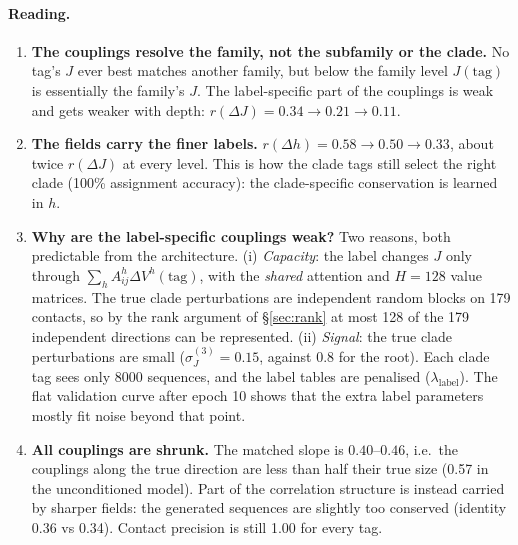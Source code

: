 \paragraph{Reading.}
\begin{enumerate}
\item \textbf{The couplings resolve the family, not the subfamily or the clade.} No tag's $J$ ever best
matches another family, but below the family level $J(\text{tag})$ is essentially the family's $J$. The
label-specific part of the couplings is weak and gets weaker with depth: $r(\Delta J)=0.34\to0.21\to0.11$.
\item \textbf{The fields carry the finer labels.} $r(\Delta h)=0.58\to0.50\to0.33$, about twice
$r(\Delta J)$ at every level. This is how the clade tags still select the right clade (100\% assignment
accuracy): the clade-specific conservation is learned in $h$.
\item \textbf{Why are the label-specific couplings weak?} Two reasons, both predictable from the architecture.
  (i) \emph{Capacity}: the label changes $J$ only through $\sum_hA^h_{ij}\Delta V^h(\text{tag})$, with the
  \emph{shared} attention and $H=128$ value matrices. The true clade perturbations are independent random blocks
  on 179 contacts, so by the rank argument of \S\ref{sec:rank} at most 128 of the 179 independent directions
  can be represented. (ii) \emph{Signal}: the true clade perturbations are small ($\sigma_J^{(3)}=0.15$, against
  0.8 for the root). Each clade tag sees only 8000 sequences, and the label tables are penalised
  ($\lambda_{\text{label}}$). The flat validation curve after epoch 10 shows that the extra label parameters
  mostly fit noise beyond that point.
\item \textbf{All couplings are shrunk.} The matched slope is $0.40$--$0.46$, i.e.\ the couplings along the
true direction are less than half their true size (0.57 in the unconditioned model). Part of the correlation
structure is instead carried by sharper fields: the generated sequences are slightly too conserved (identity
0.36 vs 0.34). Contact precision is still 1.00 for every tag.
\end{enumerate}

